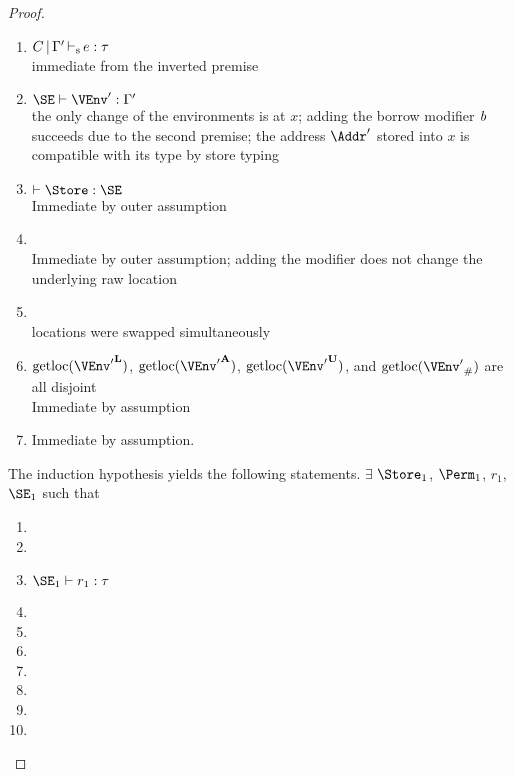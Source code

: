 \begin{proof}
  \begin{enumerate}[({A1-}1)]
  \item $C \operatorname{|} \Gamma' \operatorname{\vdash_s} e : \tau$ \\
    immediate from the inverted premise
  \item $\SE \vdash \VEnv' : \E'$ \\
    the only change of the environments is at $x$; adding the borrow
    modifier $\textit{b}$ succeeds due to the second premise; the address $\Addr'$
    stored into $x$ is compatible with its type by store typing
  \item $\vdash \Store : \SE$ \\
    Immediate by outer assumption
  \item\label{item:11} \assumeWellformed{} \\
    Immediate by outer assumption; adding the modifier does not change
    the underlying raw location
  \item\label{item:12} 
     \\
    locations were swapped simultaneously
  \item $\Rawloc{\Active{\VEnv'}}$,
    $\Rawloc{\MutableBorrows{\VEnv'}}$,
    $\Rawloc{\ImmutableBorrows{\VEnv'}}$, and
    $\Rawloc{\Suspended{\VEnv'}}$ are all disjoint \\
    Immediate by assumption
  \item\label{item:15} 
    Immediate by assumption.
  \end{enumerate}

  The induction hypothesis yields the following statements.
  $\exists$ $\Store_1$, $\Perm_1$, $r_1$, $\SE_1$ such that
  \begin{enumerate}[({R1-}1)]
  \item {}
  \item {}
  \item $\SE_1 \vdash r_1 : \tau$
  \item {}
  \item {}
  \item {}
  \item {}
  \item {}
  \item {}
  \item {}
  \end{enumerate}


\end{proof}
